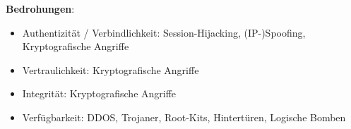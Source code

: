 \noindent
\textbf{Bedrohungen}:
\begin{itemize}
    \itemsep0.5em
    \item Authentizität / Verbindlichkeit: Session-Hijacking, (IP-)Spoofing, Kryptografische Angriffe
    \item Vertraulichkeit: Kryptografische Angriffe
    \item Integrität: Kryptografische Angriffe
    \item Verfügbarkeit: DDOS, Trojaner, Root-Kits, Hintertüren, Logische Bomben
\end{itemize}
